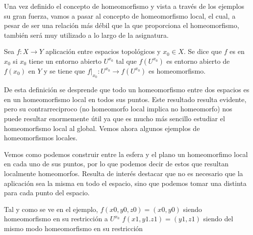 Una vez definido el concepto de homeomorfismo y vista a través de los ejemplos su gran fuerza, vamos a pasar al concepto de homeomorfismo local, el cual, a pesar de ser una relación más débil que la que proporciona el homeomorfismo, también será muy utilizado a lo largo de la asignatura.

\label{cont_def_homeomorfismoLocal}
\begin{defi}
	Sea $f:X\rightarrow Y$ aplicación entre espacios topológicos y $x_0\in X$. Se dice que $f$ es  en $x_0$ si $x_0$ tiene un entorno abierto $U^{x_0}$ tal que $f(U^{x_0})$ es entorno abierto de $f(x_0)$ en $Y$ y se tiene que $f|_{x_0}:U^{x_0}\rightarrow f(U^{x_0})$ es homeomorfismo.
\end{defi}

De esta definición se desprende que todo un homeomorfismo entre dos espacios es en un homeomorfismo local en todos sus puntos. Este resultado resulta evidente, pero su contrarreciproco (no homeomorfo local implica no homeomorfo) nos puede resultar enormemente útil ya que es mucho más sencillo estudiar  el homeomorfismo local al global.
Vemos ahora algunos ejemplos de homeomorfismos locales.

\label{cont_exa_homeomorfismoLocal}
\begin{exa}
	Vemos como podemos construir entre la esfera y el plano un homeomorfimo local en cada uno de sus puntos, por lo que podemos decir de estos que resultan localmente homeomorfos.
	Resulta de interés destacar que no es necesario que la aplicación sea la misma en todo el espacio, sino que podemos tomar una distinta para cada punto del espacio.
	
	Tal y como se ve en el ejemplo, 
	$f(x0,y0,z0)=(x0,y0)$ siendo homeomorfismo en su restricción a $U^{x_0}$
	$f(x1,y1.z1)=(y1,z1)$ siendo del mismo modo homeomorfismo en su restricción
\end{exa}

